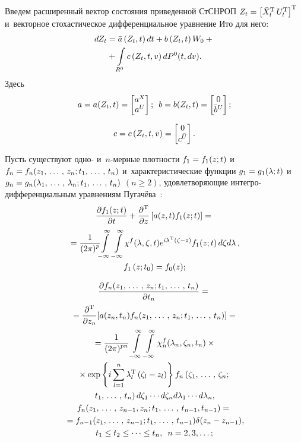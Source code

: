 \begin{multicols}{2}
Введем расширенный вектор состояния приведенной СтСНРОП $Z_t \hm= \lk \bar X_t^{\mathrm{T}}\, U_t^{\mathrm{T}}\rk^{\mathrm{T}}$ 
и~векторное стохастическое дифференциальное уравнение Ито для него:
  \begin{multline}  
  dZ_t = \bar a \left(Z_t, t\right) dt + b\left(Z_t,t\right) W_0 +{}\\
  {}+ \int\limits_{R^0} c\left(Z_t,t,v\right) dP^0(t,dv).\label{e3.1-s}
  \end{multline}
Здесь
\begin{gather*}
    a=a(Z_t,t) =\begin{bmatrix}
    a^X\\ a^U
\end{bmatrix};\enskip
 b=b(Z_t,t) =\begin{bmatrix}
    0\\ \bar b^U
\end{bmatrix};\\[6pt]
     c=c\left(Z_t,t,v\right) =\begin{bmatrix}
    0\\ c^{\bar U}
\end{bmatrix}.
\end{gather*}


Пусть существуют одно- и~$n$-мер\-ные плотности $f_1\hm=f_1(z;t)$ и~$f_n\hm= f_n(z_1\tr z_n; t_1 \tr t_n)$ 
и~характеристические функции $g_1\hm=g_1(\lambda;t)$ и~$g_n\hm=g_n(\lambda_1\tr \lambda_n; t_1\tr t_n)$ $(n\ge 2)$, 
удовлетворяющие ин\-тег\-ро-диф\-фе\-рен\-ци\-аль\-ным уравнениям Пугачёва~\cite{10-sin}:
\begin{multline} %
\fr{\prt f_1(z;t)}{\prt t}+\fr{\prt^{\mathrm{T}}}{\prt z}\lk a(z,t)f_1(z;t)\rk = {}\\
\!\!\! {}=
\fr{1}{(2 \pi)^p}\!\! \iin\iin \!\chi^f(\la,\zeta,t) e^{i\la^{\mathrm{T}}(\zeta-z)} f_1(z;t) \,d\zeta d\la\,,
\!\! %
\\
f_1\left(z;t_0\right)=f_0(z);
\label{e3.4-s}
\end{multline}


\vspace*{-12pt}

\noindent
\begin{multline} %
 \fr{\prt f_n(z_1\tr z_n;t_1\tr t_n)}{\prt t_n}={}\\
 {}=\fr{\prt^{\mathrm{T}}}{\prt z_n}[a(z_n, t_n) f_n (z_1\tr z_n; t_1\tr t_n)]={}\\
{}= \fr{1}{(2\pi)^{pn}} \iin\iin \chi_n^f (\la_n, \zeta_n, t_n)\times{}\\
{}\times \exp\lf i \sss_{l=1}^n \la_l^{\mathrm{T}} \left(\zeta_l-z_l\right)\rf f_n 
\left(\zeta_1\tr \zeta_n; \right.\\
\left. t_1\tr t_n\right)d\zeta_1\cdots d\zeta_n d\la_1\cdots d\la_n,
\\
f_n(z_1\tr z_{n-1},z_n;t_1\tr t_{n-1},t_{n-1})={}\\
{}= f_{n-1} (z_1\tr z_{n-1};t_1\tr t_{n-1})\delta (z_n - z_{n-1}),\\
t_1\le t_2 \le \cdots \le t_n,\enskip n=2,3,\ldots;\label{e3.6-s}
\end{multline}


\end{multicols}
